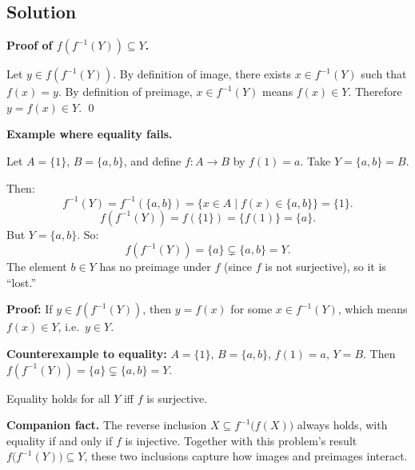 \documentclass[12pt, a4paper]{article}
\begin{document}
\subsection*{Solution}

\textbf{Proof of $f(f^{-1}(Y)) \subseteq Y$.}

Let $y \in f(f^{-1}(Y))$. By definition of image, there exists $x \in f^{-1}(Y)$
such that $f(x) = y$. By definition of preimage, $x \in f^{-1}(Y)$ means $f(x) \in Y$.
Therefore $y = f(x) \in Y$. \qed

\bigskip
\textbf{Example where equality fails.}

Let $A = \{1\}$, $B = \{a, b\}$, and define $f : A \to B$ by $f(1) = a$.
Take $Y = \{a, b\} = B$.

Then:
\[
  f^{-1}(Y) = f^{-1}(\{a,b\}) = \{x \in A \mid f(x) \in \{a,b\}\} = \{1\}.
\]
\[
  f(f^{-1}(Y)) = f(\{1\}) = \{f(1)\} = \{a\}.
\]
But $Y = \{a, b\}$. So:
\[
  f(f^{-1}(Y)) = \{a\} \subsetneq \{a, b\} = Y.
\]
The element $b \in Y$ has no preimage under $f$ (since $f$ is not surjective), so it is ``lost.''

\begin{answerbox}
\textbf{Proof:} If $y \in f(f^{-1}(Y))$, then $y = f(x)$ for some $x \in f^{-1}(Y)$,
which means $f(x) \in Y$, i.e.\ $y \in Y$.

\textbf{Counterexample to equality:}\; $A = \{1\}$, $B = \{a,b\}$, $f(1) = a$, $Y = B$.
Then $f(f^{-1}(Y)) = \{a\} \subsetneq \{a,b\} = Y$.

Equality holds for all $Y$ iff $f$ is surjective.
\end{answerbox}

\bigskip
\textbf{Companion fact.}\; The reverse inclusion $X \subseteq f^{-1}\bigl(f(X)\bigr)$ always holds, with equality if and only if $f$ is injective. Together with this problem's result $f\bigl(f^{-1}(Y)\bigr) \subseteq Y$, these two inclusions capture how images and preimages interact.
\end{document}
